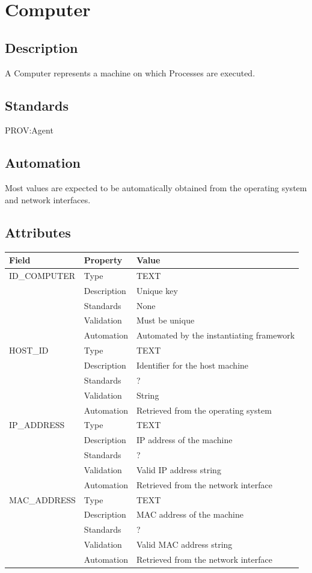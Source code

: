 \section{Computer}\label{computer}

\subsection{Description}\label{description-6}

A Computer represents a machine on which Processes are executed.

\subsection{Standards}\label{standards-8}

PROV:Agent

\subsection{Automation}\label{automation-8}

Most values are expected to be automatically obtained from the operating
system and network interfaces.

\subsection{Attributes}\label{attributes-8}

\begin{longtable}[]{@{}lll@{}}
\toprule\noalign{}
Field & Property & Value \\
\midrule\noalign{}
\endhead
\bottomrule\noalign{}
\endlastfoot
ID\_COMPUTER & Type & TEXT \\
& Description & Unique key \\
& Standards & None \\
& Validation & Must be unique \\
& Automation & Automated by the instantiating framework \\
HOST\_ID & Type & TEXT \\
& Description & Identifier for the host machine \\
& Standards & ? \\
& Validation & String \\
& Automation & Retrieved from the operating system \\
IP\_ADDRESS & Type & TEXT \\
& Description & IP address of the machine \\
& Standards & ? \\
& Validation & Valid IP address string \\
& Automation & Retrieved from the network interface \\
MAC\_ADDRESS & Type & TEXT \\
& Description & MAC address of the machine \\
& Standards & ? \\
& Validation & Valid MAC address string \\
& Automation & Retrieved from the network interface \\
\end{longtable}

